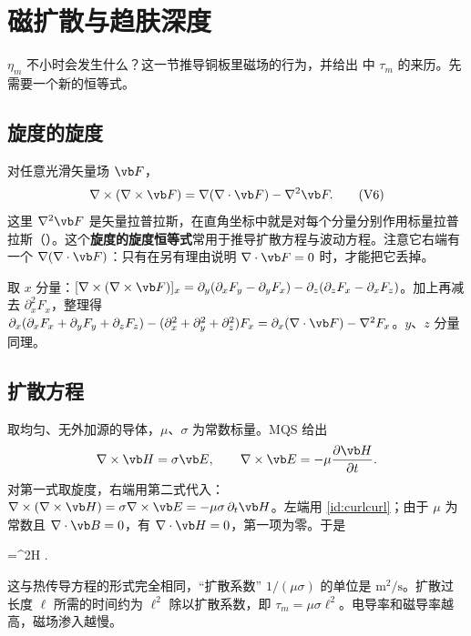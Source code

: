 \section{磁扩散与趋肤深度}\label{sec:regimes-diffusion}

$\eta_m$ 不小时会发生什么？这一节推导铜板里磁场的行为，并给出 中 $\tau_m$ 的来历。先需要一个新的恒等式。

\subsection{旋度的旋度}
对任意光滑矢量场 $\vb F$，
\begin{equation}
\nabla\times(\nabla\times\vb F)=\nabla(\nabla\cdot\vb F)-\nabla^2\vb F .
\tag{V6}\label{id:curlcurl}
\end{equation}
这里 $\nabla^2\vb F$ 是矢量拉普拉斯，在直角坐标中就是对每个分量分别作用标量拉普拉斯（）。这个\textbf{旋度的旋度恒等式}常用于推导扩散方程与波动方程。注意它右端有一个 $\nabla(\nabla\cdot\vb F)$：只有在另有理由说明 $\nabla\cdot\vb F=0$ 时，才能把它丢掉。

\begin{deeper}
取 $x$ 分量：$[\nabla\times(\nabla\times\vb F)]_x=\partial_y(\partial_xF_y-\partial_yF_x)-\partial_z(\partial_zF_x-\partial_xF_z)$。加上再减去 $\partial_x^2F_x$，整理得 $\partial_x(\partial_xF_x+\partial_yF_y+\partial_zF_z)-(\partial_x^2+\partial_y^2+\partial_z^2)F_x=\partial_x(\nabla\cdot\vb F)-\nabla^2F_x$。$y$、$z$ 分量同理。
\end{deeper}

\subsection{扩散方程}
取均匀、无外加源的导体，$\mu$、$\sigma$ 为常数标量。MQS 给出
\begin{equation}
\nabla\times\vb H=\sigma\vb E,\qquad \nabla\times\vb E=-\mu\frac{\partial\vb H}{\partial t}.
\end{equation}
对第一式取旋度，右端用第二式代入：$\nabla\times(\nabla\times\vb H)=\sigma\nabla\times\vb E=-\mu\sigma\,\partial_t\vb H$。左端用 \eqref{id:curlcurl}；由于 $\mu$ 为常数且 $\nabla\cdot\vb B=0$，有 $\nabla\cdot\vb H=0$，第一项为零。于是
\begin{keyeq}
=\nabla^2\vb H .
\label{eq:diffusion}
\end{keyeq}
这与热传导方程的形式完全相同，“扩散系数” $1/(\mu\sigma)$ 的单位是 $\mathrm{m^2/s}$。扩散过长度 $\ell$ 所需的时间约为 $\ell^2$ 除以扩散系数，即 $\tau_m=\mu\sigma\ell^2$。电导率和磁导率越高，磁场渗入越慢。

